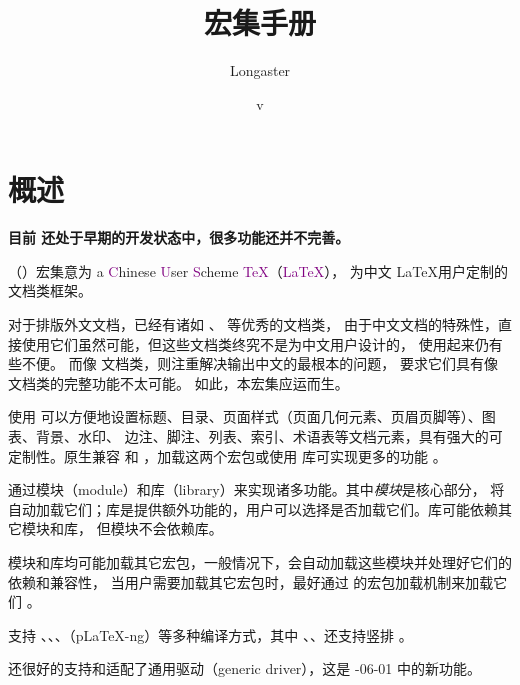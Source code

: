 \documentclass{whudoc}
\title{\WhuTeX 宏集手册}
\author{Longaster}
\date{\zhtoday\quad v\UseName{whu@versi@n}}
\begin{document}
\setlength{\lineskiplimit}{4pt}
\setlength{\lineskip}{4pt}

\def\thepage{t.\arabic{page}}
\maketitle

\frontmatter
\whudoctoc

\mainmatter
{}
\removebackground[./watermark]


\chapter{概述}

{\color{red}\bfseries 目前 \WhuTeX 还处于早期的开发状态中，很多功能还并不完善。}

\WhuTeX （\WhuLaTeX）宏集意为 a \textcolor{purple}Chinese \textcolor{purple}User
\textcolor{purple}Scheme \textcolor{purple}\TeX（\textcolor{purple}{\LaTeX}），
为中文 \LaTeX 用户定制的文档类框架。

对于排版外文文档，已经有诸如 、 等优秀的文档类，
由于中文文档的特殊性，直接使用它们虽然可能，但这些文档类终究不是为中文用户设计的，
使用起来仍有些不便。
而像  文档类，则注重解决输出中文的最根本的问题，
要求它们具有像  文档类的完整功能不太可能。
如此，本宏集应运而生。

使用 \WhuTeX 可以方便地设置标题、目录、页面样式（页面几何元素、页眉页脚等）、图表、背景、水印、
边注、脚注、列表、索引、术语表等文档元素，具有强大的可定制性。\WhuTeX 原生兼容  和 
，加载这两个宏包或使用  库可实现更多的功能 \TODO。

\WhuTeX 通过模块（module）和库（library）来实现诸多功能。其中\emph{模块}是核心部分，
\WhuTeX 将自动加载它们；库是提供额外功能的，用户可以选择是否加载它们。库可能依赖其它模块和库，
但模块不会依赖库。

模块和库均可能加载其它宏包，一般情况下，\WhuTeX 会自动加载这些模块并处理好它们的依赖和兼容性，
当用户需要加载其它宏包时，最好通过 \WhuTeX 的宏包加载机制来加载它们 \TODO。

\WhuTeX 支持 \XeLaTeX、\LuaLaTeX、\upLaTeX、\ApLaTeX（p\LaTeX-ng）等多种编译方式，其中
\LuaLaTeX、\upLaTeX、\ApLaTeX 还支持竖排 \TODO。

\WhuTeX 还很好的支持和适配了通用驱动（generic driver），这是 -06-01 中的新功能。
\end{document}
